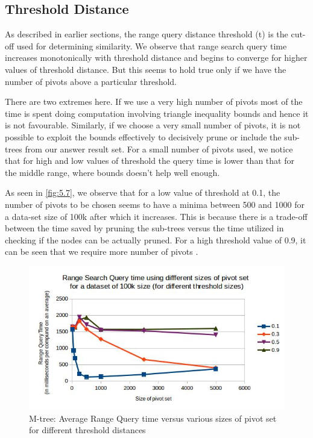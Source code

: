 \subsection{Threshold Distance}
As described in earlier sections, the range query distance threshold (t) is the cut-off used for determining similarity. We observe that range search query time increases monotonically with threshold distance and begins to converge for higher values of threshold distance. But this seems to hold true only if we have the number of pivots above a particular threshold. 

There are two extremes here. If we use a very high number of pivots most of the time is spent doing computation involving triangle inequality bounds and hence it is not favourable. Similarly, if we choose a very small number of pivots, it is not possible to exploit the bounds effectively to decisively prune or include the sub-trees from our answer result set. For a small number of pivots used, we notice that for high and low values of threshold the query time is lower than that for the middle range, where bounds doesn't help well enough.

As seen in \autoref{fig:5.7}, we observe that for a low value of threshold at 0.1, the number of pivots to be chosen seems to have a minima between 500 and 1000 for a data-set size of 100k after which it increases. This is because there is a trade-off between the time saved by pruning the sub-trees versus the time utilized in checking if the nodes can be actually pruned.  For a high threshold value of 0.9, it can be seen that we require more number of pivots . 

\begin{figure}[ht!]	
\centering
\includegraphics[width=1 \columnwidth]{img/image5.jpg}
\caption{M-tree: Average Range Query time versus various sizes of pivot set for different threshold distances}
\label{fig:5.7}
\end{figure}



